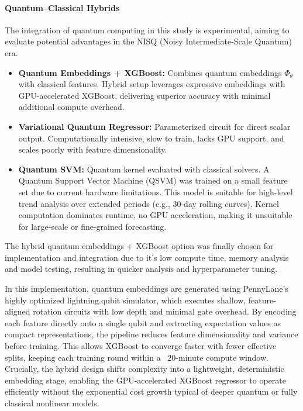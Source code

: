 \documentclass[pdflatex,sn-mathphys-num]{sn-jnl}%
\begin{document}
\paragraph{Quantum--Classical Hybrids}
The integration of quantum computing in this study is experimental, aiming to evaluate potential advantages in the NISQ (Noisy Intermediate-Scale Quantum) era.
\begin{itemize}
    \item \textbf{Quantum Embeddings + XGBoost:} Combines quantum embeddings $\Phi_\theta$ with classical features. 
    Hybrid setup leverages expressive embeddings with GPU-accelerated XGBoost, delivering superior accuracy with minimal additional compute overhead.

    \item \textbf{Variational Quantum Regressor:} Parameterized circuit for direct scalar output. 
    Computationally intensive, slow to train, lacks GPU support, and scales poorly with feature dimensionality.

    \item \textbf{Quantum SVM:} Quantum kernel evaluated with classical solvers. A Quantum Support Vector Machine (QSVM) was trained on a small feature set due to current hardware limitations. This model is suitable for high-level trend analysis over extended periods (e.g., 30-day rolling curves). 
    Kernel computation dominates runtime, no GPU acceleration, making it unsuitable for large-scale or fine-grained forecasting.
\end{itemize}

The hybrid quantum embeddings + XGBoost option was finally chosen for implementation and integration due to it's low compute time, memory analysis and model testing, resulting in quicker analysis and hyperparameter tuning.

In this implementation, quantum embeddings are generated using PennyLane’s highly optimized lightning.qubit simulator, which executes shallow, feature-aligned rotation circuits with low depth and minimal gate overhead. By encoding each feature directly onto a single qubit and extracting expectation values as compact representations, the pipeline reduces feature dimensionality and variance before training. This allows XGBoost to converge faster with fewer effective splits, keeping each training round within a ~20-minute compute window. Crucially, the hybrid design shifts complexity into a lightweight, deterministic embedding stage, enabling the GPU-accelerated XGBoost regressor to operate efficiently without the exponential cost growth typical of deeper quantum or fully classical nonlinear models.
\end{document}
